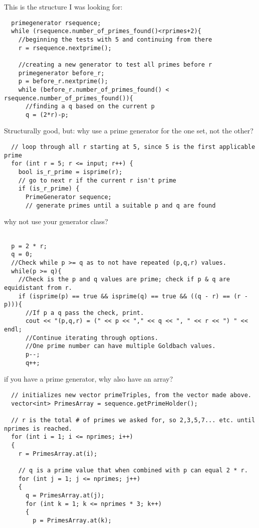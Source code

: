 This is the structure I was looking for:

\begin{lstlisting}
  primegenerator rsequence;
  while (rsequence.number_of_primes_found()<rprimes+2){
    //beginning the tests with 5 and continuing from there
    r = rsequence.nextprime();
    
    //creating a new generator to test all primes before r
    primegenerator before_r;
    p = before_r.nextprime();
    while (before_r.number_of_primes_found() < rsequence.number_of_primes_found()){
      //finding a q based on the current p
      q = (2*r)-p;
\end{lstlisting}


Structurally good, but:
why use a prime generator for the one set, not the other?

\begin{lstlisting}
  // loop through all r starting at 5, since 5 is the first applicable prime
  for (int r = 5; r <= input; r++) {
    bool is_r_prime = isprime(r);
    // go to next r if the current r isn't prime
    if (is_r_prime) {
      PrimeGenerator sequence;
      // generate primes until a suitable p and q are found
\end{lstlisting}

why not use your generator class?
\begin{lstlisting}
  
  p = 2 * r;
  q = 0;
  //Check while p >= q as to not have repeated (p,q,r) values. 
  while(p >= q){
    //Check is the p and q values are prime; check if p & q are equidistant from r. 
    if (isprime(p) == true && isprime(q) == true && ((q - r) == (r - p))){
      //If p a q pass the check, print.
      cout << "(p,q,r) = (" << p << "," << q << ", " << r << ") " << endl;
      //Continue iterating through options. 
      //One prime number can have multiple Goldbach values. 
      p--;
      q++;
\end{lstlisting}

if you have a prime generator, why also have an array?

\begin{lstlisting}
  // initializes new vector primeTriples, from the vector made above.
  vector<int> PrimesArray = sequence.getPrimeHolder();

  // r is the total # of primes we asked for, so 2,3,5,7... etc. until nprimes is reached.
  for (int i = 1; i <= nprimes; i++) 
  {
    r = PrimesArray.at(i);

    // q is a prime value that when combined with p can equal 2 * r.
    for (int j = 1; j <= nprimes; j++) 
    {
      q = PrimesArray.at(j);
      for (int k = 1; k <= nprimes * 3; k++) 
      {
        p = PrimesArray.at(k);
\end{lstlisting}

